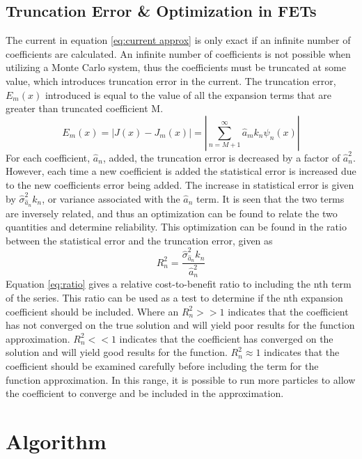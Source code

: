 \documentclass[10tma4paper]{article}
\begin{document}
\subsection{Truncation Error \& Optimization in FETs}\label{TEO}

The current in equation \eqref{eq:current approx} is only exact if an infinite number of coefficients are calculated. An infinite number of coefficients is not possible when utilizing a Monte Carlo system, thus the coefficients must be truncated at some value, which introduces truncation error in the current. The truncation error, $E_{m}(x)$ introduced is equal to the value of all the expansion terms that are greater than truncated coefficient M.
\begin{equation}\label{eq:trunc unc}
E_{m}(x) = |J(x)-J_{m}(x)|=|\sum_{n=M+1}^{\infty}\hat{a}_{m}k_{n}\psi_{n}(x)|
\end{equation}
For each coefficient, $\hat{a}_{n}$, added, the truncation error is decreased by a factor of $\hat{a}_{n}^2$. However, each time a new coefficient is added the statistical error is increased due to the new coefficients error being added. The increase in statistical error is given by $\hat{\sigma}_{\hat{a}_{n}}^2k_{n}$, or variance associated with the $\hat{a}_{n}$ term. It is seen that the two terms are inversely related, and thus an optimization can be found to relate the two quantities and determine reliability. This optimization can be found in the ratio between the statistical error and the truncation error, given as
\begin{equation}\label{eq:ratio}
R_{n}^2=\frac{\hat{\sigma}_{\hat{a}_{n}}^2k_{n}}{\hat{a}_{n}^2}
\end{equation}
Equation \eqref{eq:ratio} gives a relative cost-to-benefit ratio to including the nth term of the series. This ratio can be used as a test to determine if the nth expansion coefficient should be included. Where an $R_{n}^2>>1$ indicates that the coefficient has not converged on the true solution and will yield poor results for the function approximation. $R_{n}^2<<1$ indicates that the coefficient has converged on the solution and will yield good results for the function. $R_{n}^2\approx1$ indicates that the coefficient should be examined carefully before including the term for the function approximation. In this range, it is possible to run more particles to allow the coefficient to converge and be included in the approximation.


\section{Algorithm}\label{algorith}
\end{document}
